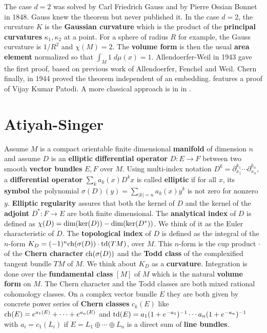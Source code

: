 \documentclass[12pt]{amsart}
\def\satz#1{ \vspace{2mm} \begin{center} \fcolorbox{yellow1}{yellow1}{ \parbox{14.0cm}{{\bf Theorem:} #1}} \vspace{2mm} \end{center} }
\newcounter{example}    \def\example#1{ \item \fontsize{12}{15} \selectfont #1 \fontsize{12}{15} \selectfont }
\begin{document}
\satz{   $\int_M K(x) \; d\mu(x)  = 2\pi \chi(M)$. }

The case $d=2$ was solved by Carl Friedrich Gauss and by Pierre Ossian Bonnet in 1848.
Gauss knew the theorem but never published it. In the case $d=2$, the curvature $K$
is the {\bf Gaussian curvature } which is the product of the {\bf principal curvatures} 
$\kappa_1,\kappa_2$ at a point. For a sphere of radius $R$ for example, 
the Gauss curvature is $1/R^2$ and $\chi(M)=2$. 
The {\bf volume form} is then the usual {\bf area element} normalized so that 
$\int_M 1 \; d\mu(x)=1$.
Allendoerfer-Weil in 1943 gave the first proof, based on previous work of
Allendoerfer, Fenchel and Weil. Chern finally, in 1944 proved the theorem
independent of an embedding.
\cite{Cycon} features a proof of Vijay Kumar Patodi. A more classical approach is in
in \cite{TuDifferentialGeometry}.

\section{Atiyah-Singer}

Assume $M$ is a compact orientable finite dimensional {\bf manifold} of dimension $n$ and 
assume $D$ is an {\bf elliptic} {\bf differential operator} $D:E \to F$ between two smooth 
{\bf vector bundles} $E,F$ over $M$. Using multi-index notation 
$D^k=\partial_{x_1}^{k_1} \cdots \partial_{x_n}^{k_n}$,
a {\bf differential operator} $\sum_{k} a_k(x) D^k x$ is called {\bf elliptic} if for all $x$,      
its {\bf symbol} the polynomial $\sigma(D)(y)=\sum_{|k|=n} a_k(x) y^k$ is not zero for nonzero $y$. 
{\bf Elliptic regularity} assures that both the kernel of $D$ and the kernel of the
{\bf adjoint} $D^*: F \to E$ are both finite dimensional. The {\bf analytical index} of $D$ is
defined as $\chi(D) = {\rm dim}({\rm ker}(D)) - {\rm dim}( {\rm ker}(D^*))$. We think of it as
the Euler characteristic of $D$. The {\bf topological index} of $D$ is
defined as the integral of the $n$-form $K_D=(-1)^n {\rm ch}(\sigma(D)) \cdot {\rm td}(TM)$, over $M$. 
This $n$-form is the cup product $\cdot$ of the {\bf Chern character} ${\rm ch}(\sigma(D))$ and the
{\bf Todd class} of the complexified tangent bundle $TM$ of $M$. We think about $K_D$ as a {\bf curvature}.
Integration is done over the {\bf fundamental class} $[M]$ of $M$ which is the natural {\bf volume form} on $M$.          
The Chern character and the Todd classes are both mixed rational cohomology classes.
On a complex vector bundle $E$ they are both given by 
concrete power series of {\bf Chern classes} $c_k(E)$ like 
${\rm ch}(E)=e^{a_1(E)} + \cdots + e^{a_n(E)}$ and
${\rm td}(E)=a_1 (1+e^{-a_1})^{-1}  \cdots a_n (1+e^{-a_n})^{-1}$ with $a_i=c_1(L_i)$ if       
$E=L_1 \oplus \cdots \oplus L_n$ is a direct sum of {\bf line bundles}.
\end{document}
